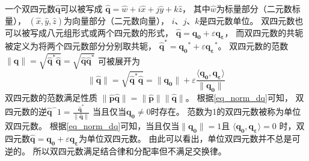 一个双四元数$\hat{\bm{q}}$可以被写成
$\hat{\bm{q}}=\hat{w}+i\hat{x}+j\hat{y}+k\hat{z}$，
其中$\hat{w}$为标量部分（二元数标量），
$(\hat{x},\hat{y},\hat{z})$为向量部分（二元数向量），
$i$、$j$、$k$是四元数单位。
双四元数也可以被写成八元组形式或两个四元数的形式，
$\hat{\bm{q}}=\bm{q_0}+\varepsilon \bm{q_{\varepsilon}}$，
而双四元数的共轭被定义为将两个四元数部分分别取共轭，
$\hat{\bm{q}}^*=\bm{q_0}^*+\varepsilon \bm{q_{\varepsilon}}^*$。
双四元数的范数$\|\hat{\bm{q}}\|=
              \sqrt{\hat{\bm{q}}^* \hat{\bm{q}}} =\sqrt{\hat{\bm{q}} \hat{\bm{q}}^*}$
可被展开为
\begin{equation}
    \label{eq_norm_dq}
    \|\hat{\bm{q}}\| = 
    \sqrt{\hat{\bm{q}}^* \hat{\bm{q}}} = 
    \|\bm{q_0}\| + 
    \varepsilon \frac{\langle \bm{q_0}, \bm{q_{\varepsilon}}\rangle}{\| \bm{q_0} \|} 
\end{equation}
双四元数的范数满足性质
$\|\hat{\bm{p}}\hat{\bm{q}}\| = \|\hat{\bm{p}}\| \|\hat{\bm{q}}\|$。
根据\ref{eq_norm_dq}可知，
双四元数的逆$\hat{\bm{q}}^-1= \frac{\hat{\bm{q}}^*}{\|\hat{\bm{q}}\|}$
当且仅当$\bm{q_0} \neq 0$时存在。
范数为1的双四元数被称为单位双四元数。
根据\ref{eq_norm_dq}可知，当且仅当$\|\bm{q_0}\|=1$且
$\langle \bm{q_0}, \bm{q_{\varepsilon}}\rangle = 0$
时，双四元数$\hat{\bm{q}}=\bm{q_0}+\varepsilon \bm{q_{\varepsilon}}$为单位双四元数。
由此可以看出，单位双四元数并不总是可逆的。
所以双四元数满足结合律和分配率但不满足交换律。

